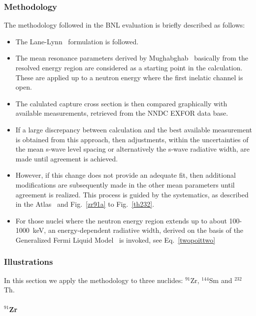 \documentclass[twocolumn,amsmath,amssymb,10pt,groupedaddress,a4paper]{revtex4}
\begin{document}
\subsubsection{Methodology}
 The methodology followed in the BNL evaluation is briefly described as follows:
\begin{itemize}
\item The Lane-Lynn~\cite{Lane:61} formulation is followed.
\item The mean resonance parameters derived  by Mughabghab~\cite{Mughabghab:06} basically from the resolved  energy region are
     considered as a starting point in
     the  calculation. These are applied up to a neutron energy where the first inelatic channel is open.
\item The calulated capture cross section is then compared graphically with available measurements, retrieved
    from the NNDC EXFOR data base.
\item If a large discrepancy between calculation and the best  available measurement is obtained from this
    approach, then adjustments,
    within the uncertainties of the mean s-wave level spacing or alternatively the s-wave radiative width, are made until
agreement is achieved.
\item However, if this change does not provide an adequate fit, then  additional modifications are subsequently
    made in the other mean parameters until agreement is realized.
   This process is guided by the systematics, as described in the Atlas~\cite{Mughabghab:06} and Fig.~\ref{zr91a}
to Fig.~\ref{th232}.
\item For those nuclei where the neutron energy region extends up to
    about 100-1000~keV, an energy-dependent
   radiative width, derived on the basis of the Generalized Fermi Liquid Model~\cite{mug01} is invoked, see Eq.~\ref{twopoittwo}
\end{itemize}


\subsubsection{Illustrations}
In this section we apply the methodology to three nuclides: $^{91}$Zr, $^{144}$Sm and $^{232}$Th.

\paragraph{$^{91}$Zr}
\end{document}
